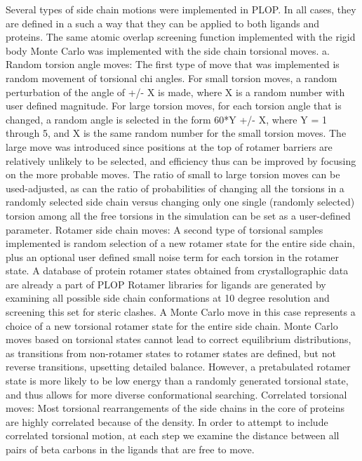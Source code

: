 Several types of side chain motions were implemented in PLOP.
In all cases, they are defined in a such a way that they can be applied to both ligands and proteins.
The same atomic overlap screening function implemented with the rigid body Monte Carlo was implemented with the side chain torsional moves.
a. Random torsion angle moves: The first type of move that was implemented is random movement of torsional chi angles.
For small torsion moves, a random perturbation of the angle of +/- X is made, where X is a random number with user defined magnitude.
For large torsion moves, for each torsion angle that is changed, a random angle is selected in the form 60*Y +/- X, where Y = 1 through 5, and X is the same random number for the small torsion moves.
The large move was introduced since positions at the top of rotamer barriers are relatively unlikely to be selected, and efficiency thus can be improved by focusing on the more probable moves.
The ratio of small to large torsion moves can be used-adjusted, as can the ratio of probabilities of changing all the torsions in a randomly selected side chain versus changing only one single (randomly selected) torsion among all the free torsions in the simulation can be set as a user-defined parameter.
Rotamer side chain moves: A second type of torsional samples implemented is random selection of a new rotamer state for the entire side chain, plus an optional user defined small noise term for each torsion in the rotamer state.
A database of protein rotamer states obtained from crystallographic data are already a part of PLOP \cite{xiang2001extending} Rotamer libraries for ligands are generated by examining all possible side chain conformations at 10 degree resolution and screening this set for steric clashes.
A Monte Carlo move in this case represents a choice of a new torsional rotamer state for the entire side chain.
Monte Carlo moves based on torsional states cannot lead to correct equilibrium distributions, as transitions from non-rotamer states to rotamer states are defined, but not reverse transitions, upsetting detailed balance.
However, a pretabulated rotamer state is more likely to be low energy than a randomly generated torsional state, and thus allows for more diverse conformational searching.
Correlated torsional moves: Most torsional rearrangements of the side chains in the core of proteins are highly correlated because of the density.
In order to attempt to include correlated torsional motion, at each step we examine the distance between all pairs of beta carbons in the ligands that are free to move.
